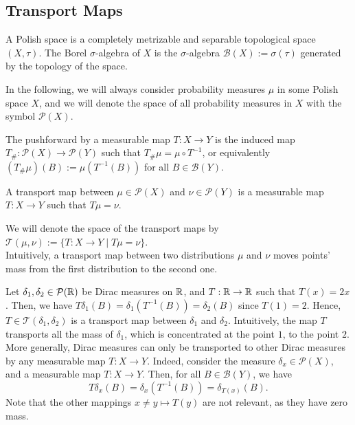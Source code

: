 \documentclass[../main.tex]{subfiles}
\begin{document}

\subsection{Transport Maps}
\begin{definition}
    A Polish space is a completely metrizable and separable topological space $(X,\tau)$. 
    The Borel $\sigma$-algebra of $X$ is the $\sigma$-algebra $\mathcal{B}(X):=\sigma(\tau)$ generated by the topology of the space.
\end{definition}

In the following, we will always consider probability measures $\mu$ in some Polish space $X$, and we will denote the space of all probability measures in $X$ with the symbol $\mathcal{P}(X)$.

\begin{definition}
    The pushforward by a measurable map $T: X \to Y$ is the induced map $T_\#: \mathcal{P}(X) \to \mathcal{P}(Y)$ such that $T_\#\mu = \mu \circ T^{-1}$, or equivalently $(T_\#\mu)(B) := \mu(T^{-1}(B))$ for all $B\in\mathcal{B}(Y)$.
\end{definition}

\begin{definition}
    A transport map between $\mu\in\mathcal{P}(X)$ and $\nu\in\mathcal{P}(Y)$ is a measurable map $T: X \to Y$ such that $T\mu = \nu$.
\end{definition}

We will denote the space of the transport maps by $\mathcal{T}(\mu, \nu) := \{T: X \to Y \mid T\mu = \nu\}$. \\
Intuitively, a transport map between two distributions $\mu$ and $\nu$ moves points' mass from the first distribution to the second one.

\begin{example}
\label{ex:dirac_tranport}
    Let $\delta_1, \delta_2\in\mathcal{P}(\mathbb{R})$ be Dirac measures on $\mathbb{R}$, and $T: \mathbb{R} \to \mathbb{R}$ such that $T(x)=2x$. Then, we have $T\delta_1(B) = \delta_1(T^{-1}(B)) = \delta_2(B)$ since $T(1) = 2$. Hence, $T\in\mathcal{T}(\delta_1, \delta_2)$ is a transport map between $\delta_1$ and  $\delta_2$. Intuitively, the map $T$ transports all the mass of $\delta_1$, which is concentrated at the point $1$, to the point $2$. \\
    More generally, Dirac measures can only be transported to other Dirac measures by any measurable map $T: X \to Y$. Indeed, consider the measure $\delta_x\in\mathcal{P}(X)$, and a measurable map $T: X \to Y$. Then, for all $B\in\mathcal{B}(Y)$, we have 
    $$T\delta_x(B) = \delta_x(T^{-1}(B)) = \delta_{T(x)}(B).$$
    Note that the other mappings $x \neq y \mapsto T(y)$ are not relevant, as they have zero mass.
\end{example}
\end{document}
